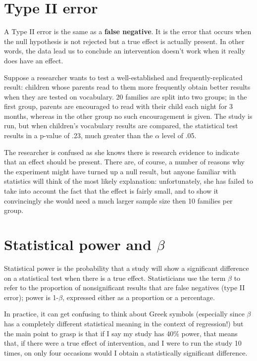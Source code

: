 \documentclass{krantz}
\begin{document}
\hypertarget{type-ii-error}{%
\section{Type II error}\label{type-ii-error}}

A Type II error is the same as a \textbf{false negative}. It is the error that occurs when the null hypothesis is not rejected but a true effect is actually present. In other words, the data lead us to conclude an intervention doesn't work when it really does have an effect.

Suppose a researcher wants to test a well-established and frequently-replicated result: children whose parents read to them more frequently obtain better results when they are tested on vocabulary. 20 families are split into two groups; in the first group, parents are encouraged to read with their child each night for 3 months, whereas in the other group no such encouragement is given. The study is run, but when children's vocabulary results are compared, the statistical test results in a p-value of .23, much greater than the \(\alpha\) level of .05.

The researcher is confused as she knows there is research evidence to indicate that an effect should be present. There are, of course, a number of reasons why the experiment might have turned up a null result, but anyone familiar with statistics will think of the most likely explanation: unfortunately, she has failed to take into account the fact that the effect is fairly small, and to show it convincingly she would need a much larger sample size then 10 families per group.

\hypertarget{statistical-power-and-beta}{%
\section{\texorpdfstring{Statistical power and \(\beta\)}{Statistical power and \textbackslash beta}}\label{statistical-power-and-beta}}

Statistical power is the probability that a study will show a significant difference on a statistical test when there is a true effect. Statisticians use the term \(\beta\) to refer to the proportion of nonsignificant results that are false negatives (type II error); power is 1-\(\beta\), expressed either as a proportion or a percentage.

In practice, it can get confusing to think about Greek symbols (especially since \(\beta\) has a completely different statistical meaning in the context of regression!) but the main point to grasp is that if I say my study has 40\% power, that means that, if there were a true effect of intervention, and I were to run the study 10 times, on only four occasions would I obtain a statistically significant difference.
\end{document}
